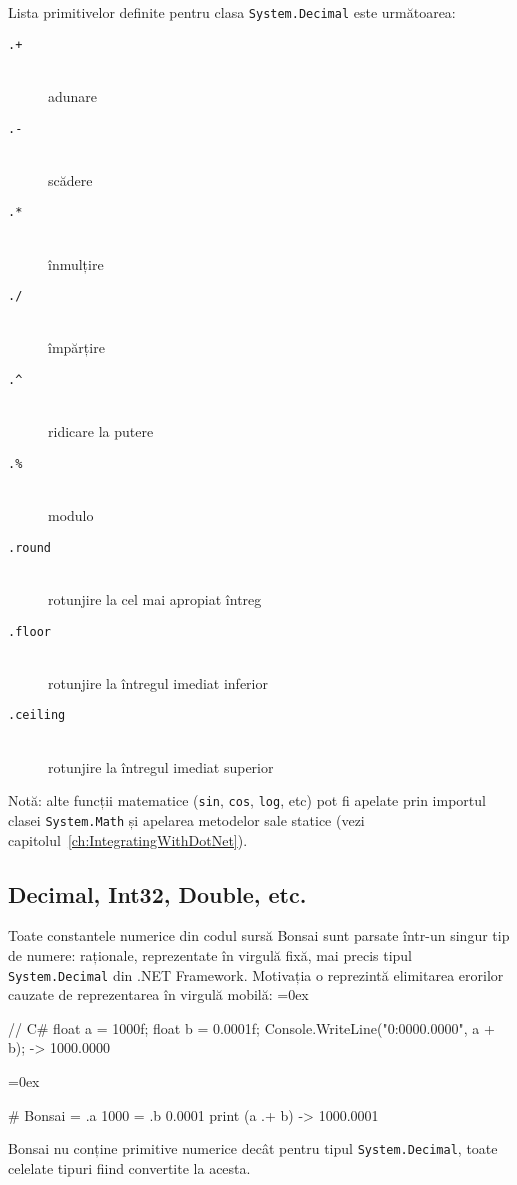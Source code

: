 \documentclass[12pt,a4paper]{memoir}
\renewcommand{\c}{\texttt}
\newenvironment{code}
{
\definecolor{shadecolor}{gray}{0.91}
\topsep=0ex
\relax
\shaded
\verbatim
}
{
\endverbatim
\endshaded
}
\begin{document}
Lista primitivelor definite pentru clasa \c{System.Decimal} este următoarea:

\begin{description}
\item[\c{.+}]\hfill\\ adunare
\item[\c{.-}]\hfill\\ scădere
\item[\c{.*}]\hfill\\ înmulțire
\item[\c{./}]\hfill\\ împărțire
\item[\c{.\textasciicircum}]\hfill\\ ridicare la putere
\item[\c{.\%}]\hfill\\ modulo
\item[\c{.round}]\hfill\\ rotunjire la cel mai apropiat întreg
\item[\c{.floor}]\hfill\\ rotunjire la întregul imediat inferior
\item[\c{.ceiling}]\hfill\\ rotunjire la întregul imediat superior
\end{description}

Notă: alte funcții matematice (\c{sin}, \c{cos}, \c{log}, etc) pot fi apelate prin importul clasei \c{System.Math} și apelarea metodelor sale statice (vezi capitolul \ref{ch:IntegratingWithDotNet}).

\subsection{Decimal, Int32, Double, etc.}

Toate constantele numerice din codul sursă Bonsai sunt parsate într-un singur tip de numere: raționale, reprezentate în virgulă fixă, mai precis tipul \c{System.Decimal} din .NET Framework. Motivația o reprezintă elimitarea erorilor cauzate de reprezentarea în virgulă mobilă:
\begin{code}
// C#
float a = 1000f;
float b = 0.0001f;
Console.WriteLine("{0:0000.0000}", a + b);
  -> 1000.0000
\end{code}
\begin{code}
# Bonsai
= .a 1000
= .b 0.0001
print (a .+ b)
  -> 1000.0001
\end{code}

Bonsai nu conține primitive numerice decât pentru tipul \c{System.Decimal}, toate celelate tipuri fiind convertite la acesta.
\end{document}
